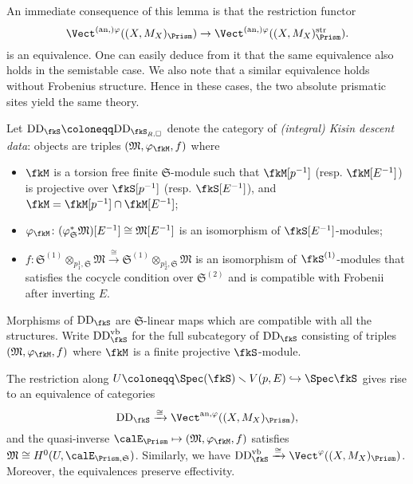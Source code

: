 \begin{rem}\label{rem:strict vs saturated for prismatic crystals}
An immediate consequence of this lemma is that the restriction functor
\[
 \Vect^{(\mathrm{an},)\varphi}((X,M_X)_\Prism) \to \Vect^{(\mathrm{an},)\varphi}((X,M_X)_\Prism^{\mathrm{str}}).
\]
is an equivalence. One can easily deduce from it that the same equivalence also holds in the semistable case. We also note that  a similar equivalence holds without Frobenius structure. 
Hence in these cases, the two absolute prismatic sites yield the same theory.
\end{rem}


\begin{defn} \label{defn:BK-descent-data}
Let $\mathrm{DD}_\fkS\coloneqq \mathrm{DD}_{\fkS_{R,\square}}$ denote the category of \emph{(integral) Kisin descent data}: objects are triples $(\mathfrak{M}, \varphi_\fkM,  f)$ where
\begin{itemize}
\item $\fkM$ is a torsion free finite $\mathfrak{S}$-module such that $\fkM[p^{-1}]$ (resp. $\fkM[E^{-1}]$) is projective over $\fkS[p^{-1}]$ (resp. $\fkS[E^{-1}]$), and $\fkM = \fkM[p^{-1}]\cap \fkM[E^{-1}]$;
\item $\varphi_\fkM\colon (\varphi_{\mathfrak{S}}^*\mathfrak{M})[E^{-1}] \cong \mathfrak{M}[E^{-1}]$ is an isomorphism of $\fkS[E^{-1}]$-modules;
\item $f\colon \mathfrak{S}^{(1)}\otimes_{p^1_1,\mathfrak{S}}\mathfrak{M}\xrightarrow{\cong}\mathfrak{S}^{(1)}\otimes_{p^1_2,\mathfrak{S}}\mathfrak{M}$ is an isomorphism of $\fkS^{(1)}$-modules that satisfies the cocycle condition over $\mathfrak{S}^{(2)}$ and is compatible with Frobenii after inverting $E$.
\end{itemize}
Morphisms of $\mathrm{DD}_\fkS$ are $\mathfrak{S}$-linear maps which are compatible with all the structures.
Write $\mathrm{DD}_\fkS^{\mathrm{vb}}$ for the full subcategory of  $\mathrm{DD}_\fkS$ consisting of triples $(\mathfrak{M}, \varphi_\fkM, f)$ where $\fkM$ is a finite projective $\fkS$-module.
\end{defn}


\begin{lem} \label{lem:descentlemmamoduleversion}
The restriction along $U\coloneqq\Spec(\fkS)\smallsetminus V(p,E)\hookrightarrow \Spec\fkS$ gives rise to an equivalence of categories
\[
\mathrm{DD}_\fkS
\xrightarrow{\cong} \Vect^{\mathrm{an},\varphi}((X,M_X)_\Prism),
\]
and the quasi-inverse $\calE_\Prism\mapsto(\mathfrak{M}, \varphi_\fkM, f)$ satisfies $\mathfrak{M} \cong H^0(U, \calE_{\Prism,\mathfrak{S}})$.
Similarly, we have $\mathrm{DD}_\fkS^{\mathrm{vb}}\xrightarrow{\cong}\Vect^{\varphi}((X,M_X)_\Prism)$. Moreover, the equivalences preserve effectivity.
\end{lem}

